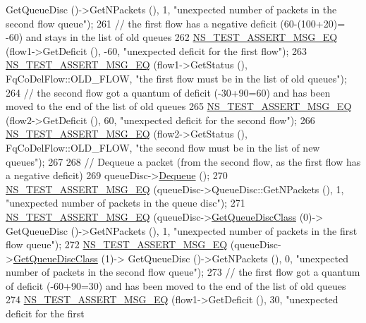\begin{DoxyCode}
      GetQueueDisc ()->GetNPackets (), 1, \textcolor{stringliteral}{"unexpected number of packets in the second flow queue"});
261   \textcolor{comment}{// the first flow has a negative deficit (60-(100+20)= -60) and stays in the list of old queues}
262   \hyperlink{group__testing_ga2a9d78cffb3db8e867c35fff0b698cf5}{NS\_TEST\_ASSERT\_MSG\_EQ} (flow1->GetDeficit (), -60, \textcolor{stringliteral}{"unexpected deficit for the first
       flow"});
263   \hyperlink{group__testing_ga2a9d78cffb3db8e867c35fff0b698cf5}{NS\_TEST\_ASSERT\_MSG\_EQ} (flow1->GetStatus (), FqCoDelFlow::OLD\_FLOW, \textcolor{stringliteral}{"the first flow
       must be in the list of old queues"});
264   \textcolor{comment}{// the second flow got a quantum of deficit (-30+90=60) and has been moved to the end of the list of old
       queues}
265   \hyperlink{group__testing_ga2a9d78cffb3db8e867c35fff0b698cf5}{NS\_TEST\_ASSERT\_MSG\_EQ} (flow2->GetDeficit (), 60, \textcolor{stringliteral}{"unexpected deficit for the second
       flow"});
266   \hyperlink{group__testing_ga2a9d78cffb3db8e867c35fff0b698cf5}{NS\_TEST\_ASSERT\_MSG\_EQ} (flow2->GetStatus (), FqCoDelFlow::OLD\_FLOW, \textcolor{stringliteral}{"the second flow
       must be in the list of new queues"});
267 
268   \textcolor{comment}{// Dequeue a packet (from the second flow, as the first flow has a negative deficit)}
269   queueDisc->\hyperlink{classns3_1_1QueueDisc_a6c13fc489822c1487f61c2289f2e3629}{Dequeue} ();
270   \hyperlink{group__testing_ga2a9d78cffb3db8e867c35fff0b698cf5}{NS\_TEST\_ASSERT\_MSG\_EQ} (queueDisc->QueueDisc::GetNPackets (), 1, \textcolor{stringliteral}{"unexpected number
       of packets in the queue disc"});
271   \hyperlink{group__testing_ga2a9d78cffb3db8e867c35fff0b698cf5}{NS\_TEST\_ASSERT\_MSG\_EQ} (queueDisc->\hyperlink{classns3_1_1QueueDisc_a584d228f7bff3f754d32793a38134556}{GetQueueDiscClass} (0)->
      GetQueueDisc ()->GetNPackets (), 1, \textcolor{stringliteral}{"unexpected number of packets in the first flow queue"});
272   \hyperlink{group__testing_ga2a9d78cffb3db8e867c35fff0b698cf5}{NS\_TEST\_ASSERT\_MSG\_EQ} (queueDisc->\hyperlink{classns3_1_1QueueDisc_a584d228f7bff3f754d32793a38134556}{GetQueueDiscClass} (1)->
      GetQueueDisc ()->GetNPackets (), 0, \textcolor{stringliteral}{"unexpected number of packets in the second flow queue"});
273   \textcolor{comment}{// the first flow got a quantum of deficit (-60+90=30) and has been moved to the end of the list of old
       queues}
274   \hyperlink{group__testing_ga2a9d78cffb3db8e867c35fff0b698cf5}{NS\_TEST\_ASSERT\_MSG\_EQ} (flow1->GetDeficit (), 30, \textcolor{stringliteral}{"unexpected deficit for the first
}
\end{DoxyCode}
